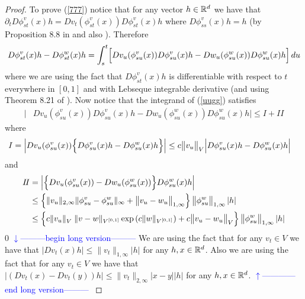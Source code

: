 \documentclass[noinfoline]{imsart}
\def\Ver{1}
\def\LongVer{0}
\begin{document}
\begin{proof}
 To prove (\ref{777}) notice that for any vector $h\in \Bbb R^d$ we have that $\partial_t D \phi_{st}^v(x)h= Dv_t (\phi_{st}^v(x))D \phi_{st}^v(x)h $ where $ D \phi_{ss}^v(x)h = h$ (by Proposition 8.8 in \cite{you:10} and also  \cite{dup:98}). Therefore
 \begin{align}
 \label{uugg}
 D \phi_{st}^v(x)h -  D \phi_{st}^w(x)h = \int_s^t \Bigl[  Dv_u (\phi_{su}^v(x))D \phi_{su}^v(x)h -  Dw_u (\phi_{su}^w(x))D \phi_{su}^w(x)h \Bigr]\,du
 \end{align}
 where we are using the fact that $D \phi_{st}^v(x)h$  is differentiable with respect to $t$ everywhere in $[0,1]$ and with  Lebseque integrable derivative   (and using Theorem 8.21 of \cite{rud:66}).
 Now notice that the integrand of (\ref{uugg}) satisfies
  \begin{align*}
\bigl| &Dv_u (\phi_{su}^v(x))D \phi_{su}^v(x)h -  Dw_u (\phi_{su}^w(x))D \phi_{su}^w(x)h  \bigr| \leq I + I\!I
\end{align*}
where
\begin{align*}
I &=  \left| Dv_u (\phi_{su}^v(x)) \Bigl\{ D \phi_{su}^v(x)h - D \phi_{su}^w(x)h \Bigr\}  \right| \leq   c\bigl\| v_u\bigr\|_{V} \Bigl|   D \phi_{su}^v(x)h - D \phi_{su}^w(x)h  \Bigr|
\end{align*}
and
\begin{align*}
I\!I & =  \left|\Bigl\{ Dv_u (\phi_{su}^v(x)) -  Dw_u (\phi_{su}^w(x))  \Bigr\} D \phi_{su}^w(x)h  \right| \\
&\leq   \Bigl\{ \| v_u \|_{2,\infty} \| \phi_{su}^v - \phi_{su}^w \|_\infty   + \bigl\| v_u-w_u\bigr \|_{1,\infty} \Bigr\} \,  \bigl\| \phi_{su}^w\bigr\|_{1,\infty} \, |h |\\
&\leq \Bigl\{   c \| v_u \|_{V^{\phantom{[}}}  \|v-w\|_{V^{[0,1]}} \exp\left(c\| w \|_{V^{[0,1]}} \right)   + c\bigl\| v_u-w_u\bigr \|_{V} \Bigr\}\,  \bigl\| \phi_{su}^w\bigr\|_{1,\infty} \, |h |
 \end{align*}
\if\Ver\LongVer{
{\flushleft\textcolor{blue}{$\downarrow$---------begin long version---------}}\newline
We are using the fact that for any $v_t\in V$ we have that $\bigl |Dv_t (x) h \bigr |\leq \| v_t \|_{1,\infty } | h| $ for any $ h,  x \in \Bbb R^d$.  Also we are using the fact that for any $v_t\in V$ we have that $\bigl |(Dv_t (x) - Dv_t(y))h \bigr |\leq \| v_t \|_{2,\infty }|x-y| | h| $ for any $ h,  x \in \Bbb R^d$.
  {\flushleft\textcolor{blue}{$\uparrow$------------end long version---------}}\newline
}
\end{proof}
\end{document}

